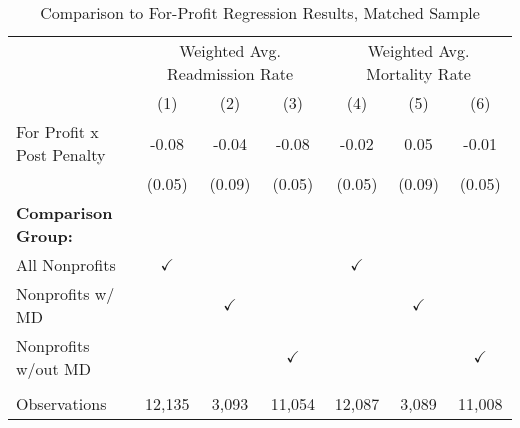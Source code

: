 \begin{table}[htbp]
   \caption{\label{tab:forprofit_matchsample} Comparison to For-Profit Regression Results, Matched Sample}
   \bigskip
   \centering
   \begin{tabular}{lcccccc}
      \toprule
       & \multicolumn{3}{c}{Weighted Avg. Readmission Rate} & \multicolumn{3}{c}{Weighted Avg. Mortality Rate}\\
                                  & (1)           & (2)           & (3)           & (4)           & (5)           & (6)\\  
      \midrule 
      For Profit x Post Penalty   & -0.08         & -0.04         & -0.08         & -0.02         & 0.05          & -0.01\\   
                                  & (0.05)        & (0.09)        & (0.05)        & (0.05)        & (0.09)        & (0.05)\\   
      \textbf{Comparison Group:}  &               &               &               &               &               & \\  
      All Nonprofits              & $\checkmark$  &               &               & $\checkmark$  &               & \\  
      Nonprofits w/ MD            &               & $\checkmark$  &               &               & $\checkmark$  & \\  
      Nonprofits w/out MD         &               &               & $\checkmark$  &               &               & $\checkmark$\\   
       \\
      Observations                & 12,135        & 3,093         & 11,054        & 12,087        & 3,089         & 11,008\\  
      \bottomrule
   \end{tabular}
\end{table}
